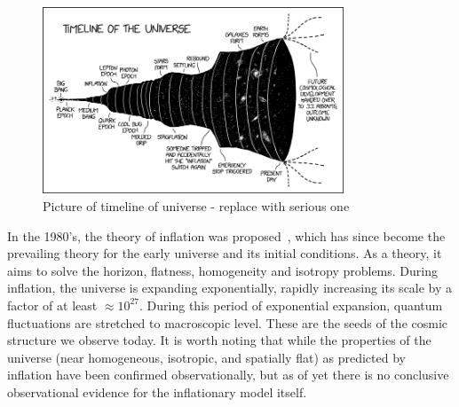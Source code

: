\begin{figure}[ht]
	\centering
	\includegraphics[width=0.8\textwidth]{fig/timeline_of_the_universe.png}
	\caption{Picture of timeline of universe - replace with serious one}
	\label{fig:timelineuniverse}
\end{figure}
In the 1980's, the theory of inflation was proposed~\cite{Guth:1980zm,Linde:1981mu,Albrecht:1982wi}, which has since become the prevailing theory for the early universe and its initial conditions. As a theory, it aims to solve the horizon, flatness, homogeneity and isotropy problems. During inflation, the universe is expanding exponentially, rapidly increasing its scale by a factor of at least $\approx 10^{27}$. During this period of exponential expansion, quantum fluctuations are stretched to macroscopic level. These are the seeds of the cosmic structure we observe today. It is worth noting that while the properties of the universe (near homogeneous, isotropic, and spatially flat) as predicted by inflation have been confirmed observationally, but as of yet there is no conclusive observational evidence for the inflationary model itself. 

